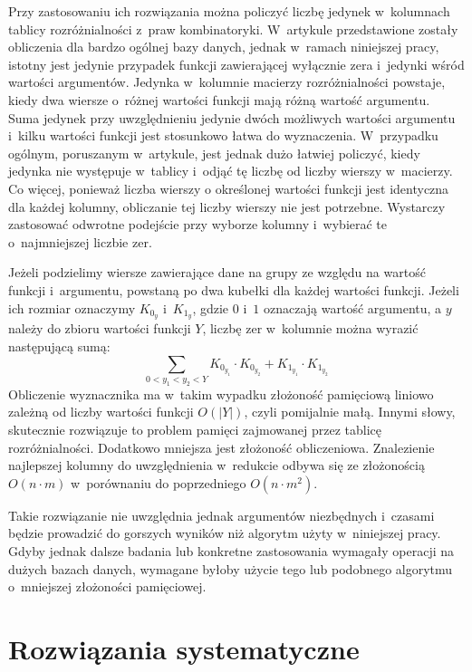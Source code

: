 Przy zastosowaniu ich rozwiązania można policzyć liczbę jedynek w~kolumnach tablicy rozróżnialności z~praw kombinatoryki.
W~artykule przedstawione zostały obliczenia dla bardzo ogólnej bazy danych,
jednak w~ramach niniejszej pracy,
istotny jest jedynie przypadek funkcji zawierającej wyłącznie zera i~jedynki wśród wartości argumentów.
Jedynka w~kolumnie macierzy rozróżnialności powstaje,
kiedy dwa wiersze o~różnej wartości funkcji mają różną wartość argumentu.
Suma jedynek przy uwzględnieniu jedynie dwóch możliwych wartości argumentu i~kilku wartości funkcji jest stosunkowo łatwa do wyznaczenia.
W~przypadku ogólnym,
poruszanym w~artykule,
jest jednak dużo łatwiej policzyć,
kiedy jedynka nie występuje w~tablicy i~odjąć tę liczbę od liczby wierszy w~macierzy.
Co więcej,
ponieważ liczba wierszy o określonej wartości funkcji jest identyczna dla każdej kolumny,
obliczanie tej liczby wierszy nie jest potrzebne.
Wystarczy zastosować odwrotne podejście przy wyborze kolumny i~wybierać te o~najmniejszej liczbie zer.

Jeżeli podzielimy wiersze zawierające dane na grupy ze względu na wartość funkcji i~argumentu,
powstaną po dwa kubełki dla każdej wartości funkcji.
Jeżeli ich rozmiar oznaczymy $K_{0_y}$ i~$K_{1_y}$,
 gdzie $0$ i~$1$ oznaczają wartość argumentu,
a $y$ należy do zbioru wartości funkcji $Y$,
liczbę zer w~kolumnie można wyrazić następującą sumą:
\begin{equation}
\sum_{0<y_1<y_2<Y} K_{0_{y_1}} \cdot K_{0_{y_2}} + K_{1_{y_1}} \cdot K_{1_{y_2}}
\end{equation}
Obliczenie wyznacznika ma w~takim wypadku złożoność pamięciową liniowo zależną od liczby wartości funkcji $O(\left\vert{Y}\right\vert)$,
czyli pomijalnie małą.
Innymi słowy, skutecznie rozwiązuje to problem pamięci zajmowanej przez tablicę rozróżnialności.
Dodatkowo mniejsza jest złożoność obliczeniowa.
Znalezienie najlepszej kolumny do uwzględnienia w~redukcie odbywa się ze złożonością $O(n \cdot m)$ w~porównaniu do poprzedniego $O(n \cdot m^2)$.

Takie rozwiązanie nie uwzględnia jednak argumentów niezbędnych i~czasami będzie prowadzić do gorszych wyników niż algorytm użyty w~niniejszej pracy.
Gdyby jednak dalsze badania lub konkretne zastosowania wymagały operacji na dużych bazach danych,
wymagane byłoby użycie tego lub podobnego algorytmu o~mniejszej złożoności pamięciowej.

\section{Rozwiązania systematyczne}

